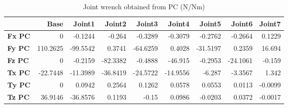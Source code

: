 \begin{table}[h!]
	\centering
	\caption{Joint wrench obtained from PC (N/Nm)}
	\label{wrech_PC_Pose15}
	\begin{tabular}{|l|r|r|r|r|r|r|r|r|}
		\hline
		\textbf{}  & \textbf{Base} & \textbf{Joint1}  & \textbf{Joint2}  & \textbf{Joint3}  & \textbf{Joint4}  & \textbf{Joint5}  & \textbf{Joint6}  & \textbf{Joint7} \\ \hline
		\textbf{Fx PC}  & 0        & -0.1244        & -0.264        & -0.3289        & -0.3079        & -0.2762        & -0.2664        & 0.1229 \\ \hline
		\textbf{Fy PC}  & 110.2625        & -99.5542        & 0.3741        & -64.6259        & 0.4028        & -31.5197        & 0.2359        & 16.694 \\ \hline
		\textbf{Fz PC}  & 0        & -0.2159        & -82.3382        & -0.4888        & -46.915        & -0.2953        & -24.1061        & -0.159 \\ \hline
		\textbf{Tx PC}  & -22.7448        & -11.3989        & -36.8419        & -24.5722        & -14.9556        & -6.287        & -3.3567        & 1.342 \\ \hline
		\textbf{Ty PC}  & 0        & 0.0942        & 0.2564        & 0.1262        & 0.0578        & 0.0553        & 0.0113        & -0.0099 \\ \hline
		\textbf{Tz PC}  & 36.9146        & -36.8576        & 0.1193        & -0.15        & 0.0986        & -0.0203        & 0.0372        & -0.0017 \\ \hline
	\end{tabular}
\end{table}

